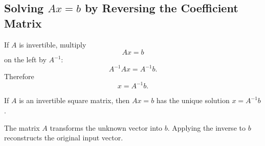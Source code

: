 \subsection{Solving $Ax=b$ by Reversing the Coefficient Matrix}

If $A$ is invertible, multiply
\[
Ax=b
\]
on the left by $A^{-1}$:
\[
A^{-1}Ax=A^{-1}b.
\]
Therefore
\[
\boxed{x=A^{-1}b}.
\]

\begin{theorembox}
If $A$ is an invertible square matrix, then $Ax=b$ has the unique solution $x=A^{-1}b$.
\end{theorembox}

\begin{interpretationbox}
The matrix $A$ transforms the unknown vector into $b$. Applying the inverse to $b$ reconstructs the original input vector.
\end{interpretationbox}
